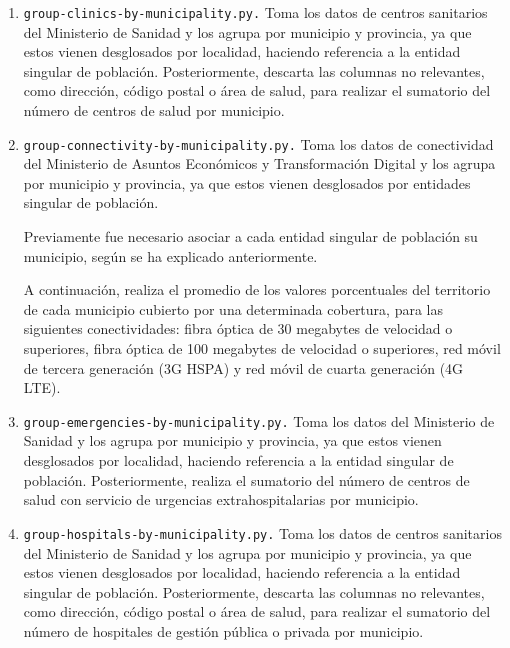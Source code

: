 \begin{enumerate}
    \item \texttt{group-clinics-by-municipality.py.} Toma los datos de centros sanitarios del Ministerio de Sanidad y los agrupa por municipio y provincia, ya que estos vienen desglosados por localidad, haciendo referencia a la entidad singular de población. Posteriormente, descarta las columnas no relevantes, como dirección, código postal o área de salud, para realizar el sumatorio del número de centros de salud por municipio.

    \item \texttt{group-connectivity-by-municipality.py.} Toma los datos de conectividad del Ministerio de Asuntos Económicos y Transformación Digital y los agrupa por municipio y provincia, ya que estos vienen desglosados por entidades singular de población.

    
    Previamente fue necesario asociar a cada entidad singular de población su municipio, según se ha explicado anteriormente.

    
    A continuación, realiza el promedio de los valores porcentuales del territorio de cada municipio cubierto por una determinada cobertura, para las siguientes conectividades: fibra óptica de 30 megabytes de velocidad o superiores, fibra óptica de 100 megabytes de velocidad o superiores, red móvil de tercera generación (3G HSPA) y red móvil de cuarta generación (4G LTE).

    \item \texttt{group-emergencies-by-municipality.py.} Toma los datos del Ministerio de Sanidad y los agrupa por municipio y provincia, ya que estos vienen desglosados por localidad, haciendo referencia a la entidad singular de población. Posteriormente, realiza el sumatorio del número de centros de salud con servicio de urgencias extrahospitalarias por municipio.

    \item \texttt{group-hospitals-by-municipality.py.} Toma los datos de centros sanitarios del Ministerio de Sanidad y los agrupa por municipio y provincia, ya que estos vienen desglosados por localidad, haciendo referencia a la entidad singular de población. Posteriormente, descarta las columnas no relevantes, como dirección, código postal o área de salud, para realizar el sumatorio del número de hospitales de gestión pública o privada por municipio.
    

\end{enumerate}
